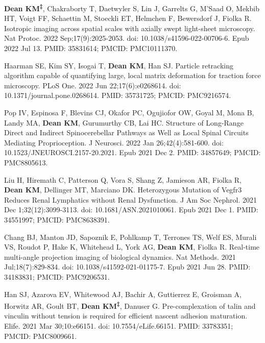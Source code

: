 \begin{etaremune}
\item \textbf{Dean KM\textsuperscript{‡}}, Chakraborty T, Daetwyler S, Lin J, Garrelts G, M'Saad O, Mekbib HT, Voigt FF, Schaettin M, Stoeckli ET, Helmchen F, Bewersdorf J, Fiolka R. Isotropic imaging across spatial scales with axially swept light-sheet microscopy. Nat Protoc. 2022 Sep;17(9):2025-2053. doi: 10.1038/s41596-022-00706-6. Epub 2022 Jul 13. PMID: 35831614; PMCID: PMC10111370.

\item Haarman SE, Kim SY, Isogai T, \textbf{Dean KM}, Han SJ. Particle retracking algorithm capable of quantifying large, local matrix deformation for traction force microscopy. PLoS One. 2022 Jun 22;17(6):e0268614. doi: 10.1371/journal.pone.0268614. PMID: 35731725; PMCID: PMC9216574.

\item Pop IV, Espinosa F, Blevins CJ, Okafor PC, Ogujiofor OW, Goyal M, Mona B, Landy MA, \textbf{Dean KM}, Gurumurthy CB, Lai HC. Structure of Long-Range Direct and Indirect Spinocerebellar Pathways as Well as Local Spinal Circuits Mediating Proprioception. J Neurosci. 2022 Jan 26;42(4):581-600. doi: 10.1523/JNEUROSCI.2157-20.2021. Epub 2021 Dec 2. PMID: 34857649; PMCID: PMC8805613.

\item Liu H, Hiremath C, Patterson Q, Vora S, Shang Z, Jamieson AR, Fiolka R, \textbf{Dean KM}, Dellinger MT, Marciano DK. Heterozygous Mutation of Vegfr3 Reduces Renal Lymphatics without Renal Dysfunction. J Am Soc Nephrol. 2021 Dec 1;32(12):3099-3113. doi: 10.1681/ASN.2021010061. Epub 2021 Dec 1. PMID: 34551997; PMCID: PMC8638391.

\item Chang BJ, Manton JD, Sapoznik E, Pohlkamp T, Terrones TS, Welf ES, Murali VS, Roudot P, Hake K, Whitehead L, York AG, \textbf{Dean KM}, Fiolka R. Real-time multi-angle projection imaging of biological dynamics. Nat Methods. 2021 Jul;18(7):829-834. doi: 10.1038/s41592-021-01175-7. Epub 2021 Jun 28. PMID: 34183831; PMCID: PMC9206531.

\item Han SJ, Azarova EV, Whitewood AJ, Bachir A, Guttierrez E, Groisman A, Horwitz AR, Goult BT, \textbf{Dean KM\textsuperscript{‡}}, Danuser G. Pre-complexation of talin and vinculin without tension is required for efficient nascent adhesion maturation. Elife. 2021 Mar 30;10:e66151. doi: 10.7554/eLife.66151. PMID: 33783351; PMCID: PMC8009661.


\end{etaremune}
